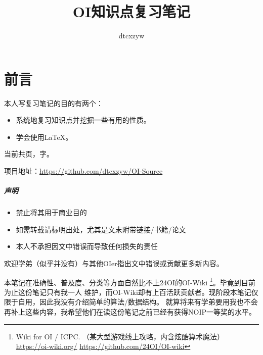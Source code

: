 \documentclass[10pt,AutoFakeBold,AutoFakeSlant,b5paper]{book}
\begin{document}
\newtheorem{theorem}{定理}[chapter]
\newtheorem{lemma}[theorem]{引理}
\newtheorem{property}[theorem]{性质}
\newtheorem{inference}[theorem]{推论}
\newcommand{\ud}{\mathrm{d}}
\newcommand{\binomial}[2]{\left(#1 \atop #2\right)}
\newcommand{\stirlingA}[2]{\left[#1 \atop #2\right]}
\newcommand{\stirlingB}[2]{\left\{#1 \atop #2\right\}}
\title{OI知识点复习笔记}
\author{dtcxzyw}
\frontmatter
\maketitle
\chapter{前言}
本人写复习笔记的目的有两个：
\begin{itemize}
	\item 系统地复习知识点并挖掘一些有用的性质。
	\item 学会使用\LaTeX{}。
\end{itemize}

当前共\pageref{LastPage}页，字。

项目地址：\url{https://github.com/dtcxzyw/OI-Source}

\paragraph{声明}
{\bfseries
\begin{itemize}
    \item 禁止将其用于商业目的
    \item 如需转载请标明出处，尤其是文末附带链接/书籍/论文
    \item 本人不承担因文中错误而导致任何损失的责任
\end{itemize}
}

欢迎学弟（似乎并没有）与其他OIer指出文中错误或贡献更多新内容。

本笔记在准确性、普及度、分类等方面自然比不上24OI的OI-Wiki
\footnote{Wiki for OI / ICPC. （某大型游戏线上攻略，内含炫酷算术魔法）
\url{https://oi-wiki.org/}
\url{https://github.com/24OI/OI-wiki}}。毕竟到目前为止这份笔记只有我一人
维护，而OI-Wiki却有上百活跃贡献者。现阶段本笔记仅限于自用，因此我没有介绍简单的算法/数据结构。
就算将来有学弟要用我也不会再补上这些内容，我希望他们在读这份笔记之前已经有获得NOIP一等奖的水平。

\renewcommand\contentsname{目录}
\tableofcontents
\mainmatter
\adjustmtc



















\appendix

\printindex

\backmatter

\end{document}
